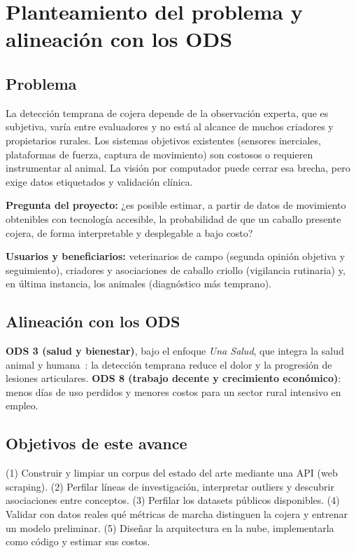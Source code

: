 \documentclass[conference,a4paper]{IEEEtran}
\begin{document}
\section{Planteamiento del problema y alineación con los ODS}
\subsection{Problema}
La detección temprana de cojera depende de la observación experta, que es subjetiva, varía entre evaluadores y no está al alcance de muchos criadores y propietarios rurales. Los sistemas objetivos existentes (sensores inerciales, plataformas de fuerza, captura de movimiento) son costosos o requieren instrumentar al animal. La visión por computador puede cerrar esa brecha, pero exige datos etiquetados y validación clínica.

\textbf{Pregunta del proyecto:} ¿es posible estimar, a partir de datos de movimiento obtenibles con tecnología accesible, la probabilidad de que un caballo presente cojera, de forma interpretable y desplegable a bajo costo?

\textbf{Usuarios y beneficiarios:} veterinarios de campo (segunda opinión objetiva y seguimiento), criadores y asociaciones de caballo criollo (vigilancia rutinaria) y, en última instancia, los animales (diagnóstico más temprano).

\subsection{Alineación con los ODS}
\textbf{ODS 3 (salud y bienestar)}, bajo el enfoque \emph{Una Salud}, que integra la salud animal y humana~\cite{un2015}: la detección temprana reduce el dolor y la progresión de lesiones articulares. \textbf{ODS 8 (trabajo decente y crecimiento económico)}: menos días de uso perdidos y menores costos para un sector rural intensivo en empleo.

\subsection{Objetivos de este avance}
(1) Construir y limpiar un corpus del estado del arte mediante una API (web scraping). (2) Perfilar líneas de investigación, interpretar outliers y descubrir asociaciones entre conceptos. (3) Perfilar los datasets públicos disponibles. (4) Validar con datos reales qué métricas de marcha distinguen la cojera y entrenar un modelo preliminar. (5) Diseñar la arquitectura en la nube, implementarla como código y estimar sus costos.
\end{document}

